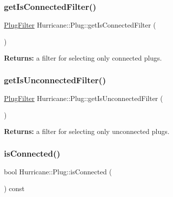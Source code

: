 \subsubsection{\texorpdfstring{get\+Is\+Connected\+Filter()}{getIsConnectedFilter()}}
{\footnotesize\ttfamily \mbox{\hyperlink{namespaceHurricane_ad6b0bd4bdff4c52e6163b9f54e3e5c92}{Plug\+Filter}} Hurricane\+::\+Plug\+::get\+Is\+Connected\+Filter (\begin{DoxyParamCaption}{ }\end{DoxyParamCaption})\hspace{0.3cm}{\ttfamily [static]}}

{\bfseries Returns\+:} a filter for selecting only connected plugs. \mbox{\label{classHurricane_1_1Plug_af27b873ed2420329a63ea67dcc243f07}} 
\subsubsection{\texorpdfstring{get\+Is\+Unconnected\+Filter()}{getIsUnconnectedFilter()}}
{\footnotesize\ttfamily \mbox{\hyperlink{namespaceHurricane_ad6b0bd4bdff4c52e6163b9f54e3e5c92}{Plug\+Filter}} Hurricane\+::\+Plug\+::get\+Is\+Unconnected\+Filter (\begin{DoxyParamCaption}{ }\end{DoxyParamCaption})\hspace{0.3cm}{\ttfamily [static]}}

{\bfseries Returns\+:} a filter for selecting only unconnected plugs. \mbox{\label{classHurricane_1_1Plug_a177400e23157885a76c924bf53000957}} 
\subsubsection{\texorpdfstring{is\+Connected()}{isConnected()}}
{\footnotesize\ttfamily bool Hurricane\+::\+Plug\+::is\+Connected (\begin{DoxyParamCaption}{ }\end{DoxyParamCaption}) const\hspace{0.3cm}{\ttfamily [inline]}}

